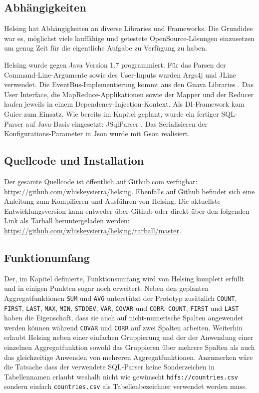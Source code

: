 \documentclass[a4paper]{article}
\begin{document}
\subsection{Abhängigkeiten}
Helsing hat Abhängigkeiten an diverse Libraries und Frameworks. Die Grundidee war es, möglichst viele lauffähige und getestete OpenSource-Lösungen einzusetzen um genug Zeit für die eigentliche Aufgabe zu Verfügung zu haben.

Helsing wurde gegen Java Version 1.7 programmiert. Für das Parsen der Command-Line-Argumente sowie des User-Inputs wurden Args4j \cite{Args4j} und JLine \cite{JLine} verwendet. Die EventBus-Implementierung kommt aus den Guava Libraries \cite{Guava}. Das User Interface, die MapReduce-Applikationen sowie der Mapper und der Reducer laufen jeweils in einem Dependency-Injection-Kontext. Als DI-Framework kam Guice \cite{Guice} zum Einsatz. Wie bereits im Kapitel  geplant, wurde ein fertiger SQL-Parser auf Java-Basis eingesetzt: JSqlParser \cite{JSqlParser}. Das Serialisieren der Konfigurations-Parameter in Json wurde mit Gson \cite{Gson} realisiert.

\subsection{Quellcode und Installation}
Der gesamte Quellcode ist öffentlich auf Github.com verfügbar: \url{https://github.com/whiskeysierra/helsing}. Ebenfalls auf Github befindet sich eine Anleitung zum Kompilieren und Ausführen von Helsing. Die aktuellste Entwicklungsversion kann entweder über Github oder direkt über den folgenden Link als Tarball heruntergeladen werden: \url{https://github.com/whiskeysierra/helsing/tarball/master}.

\subsection{Funktionumfang}
Der, im Kapitel  definierte, Funktionsumfang wird von Helsing komplett erfüllt und in einigen Punkten sogar noch erweitert. Neben den geplanten Aggregatfunktionen \texttt{SUM} und \texttt{AVG} unterstützt der Prototyp zusätzlich \texttt{COUNT}, \texttt{FIRST}, \texttt{LAST}, \texttt{MAX}, \texttt{MIN}, \texttt{STDDEV}, \texttt{VAR}, \texttt{COVAR} und \texttt{CORR}. \texttt{COUNT}, \texttt{FIRST} und \texttt{LAST} haben die Eigenschaft, dass sie auch auf nicht-numerische Spalten angewendet werden können während \texttt{COVAR} und \texttt{CORR} auf zwei Spalten arbeiten.
Weiterhin erlaubt Helsing neben einer einfachen Gruppierung und der der Anwendung einer einzelnen Aggregatfunktion sowohl das Gruppieren über mehrere Spalten als auch das gleichzeitige Anwenden von mehreren Aggregatfunktionen.
Anzumerken wäre die Tatsache dass der verwendete SQL-Parser keine Sonderzeichen in Tabellennamen erlaubt weshalb nicht wie gewünscht \texttt{hdfs://countries.csv} sondern einfach \texttt{countries.csv} als Tabellenbezeichner verwendet werden muss.
\end{document}
